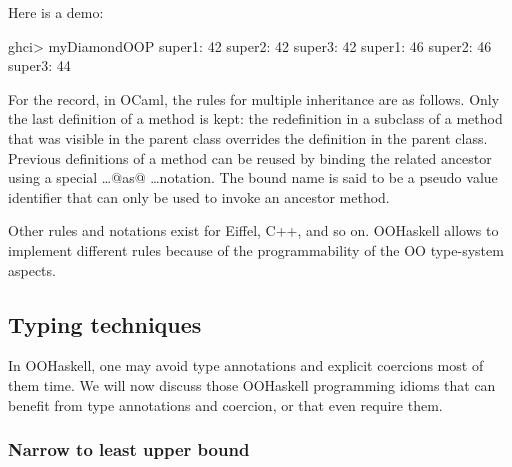 \documentclass{jfp}
\begin{document}
Here is a demo:


\begin{code}
 ghci> myDiamondOOP
 super1: 42
 super2: 42
 super3: 42
 super1: 46
 super2: 46
 super3: 44
\end{code}

For the record, in OCaml, the rules for multiple inheritance are as
follows. Only the last definition of a method is kept: the
redefinition in a subclass of a method that was visible in the parent
class overrides the definition in the parent class. Previous
definitions of a method can be reused by binding the related ancestor
using a special \ldots @as@ \ldots notation. The bound name is said to
be a pseudo value identifier that can only be used to invoke an
ancestor method.

Other rules and notations exist for Eiffel, C++, and so on. OOHaskell
allows to implement different rules because of the programmability of
the OO type-system aspects. 






\subsection{Typing techniques}

In OOHaskell, one may avoid type annotations and explicit coercions
most of them time. We will now discuss those OOHaskell programming
idioms that can benefit from type annotations and coercion, or that
even require them.






\subsubsection{Narrow to least upper bound}
\end{document}
